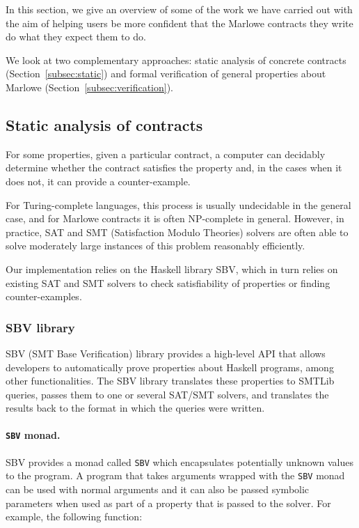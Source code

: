 \documentclass[runningheads]{llncs}
\begin{document}
In this section, we give an overview of some of the work we have carried out with the aim of helping users be more confident that the Marlowe contracts they write do what they expect them to do.

We look at two complementary approaches: static analysis of concrete contracts (Section~\ref{subsec:static}) and formal verification of general properties about Marlowe (Section~\ref{subsec:verification}).

\subsection{Static analysis of contracts\label{subsec:static}}

For some properties, given a particular contract, a computer can decidably determine whether the contract satisfies the property and, in the cases when it does not, it can provide a counter-example.

For Turing-complete languages, this process is usually undecidable in the general case, and for Marlowe contracts it is often NP-complete in general. However, in practice, SAT and SMT (Satisfaction Modulo Theories) solvers are often able to solve moderately large instances of this problem reasonably efficiently.

Our implementation relies on the Haskell library SBV, which in turn relies on existing SAT and SMT solvers to check satisfiability of properties or finding counter-examples.

\subsubsection{SBV library}

SBV (SMT Base Verification) library provides a high-level API that allows developers to automatically prove properties about Haskell programs, among other functionalities. 
The SBV library %
translates these properties to SMTLib queries, passes them to one or several SAT/SMT solvers, and translates the results back to the format in which the queries were written.

\paragraph{\texttt{SBV} monad.}

SBV provides a monad called \texttt{SBV} which encapsulates potentially unknown values to the program. A program that takes arguments wrapped with the \texttt{SBV} monad can be used with normal arguments and it can also be passed symbolic parameters when used as part of a property that is passed to the solver.
For example, the following function:
\end{document}
